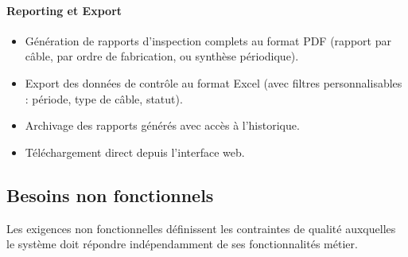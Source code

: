 \paragraph{Reporting et Export}

\begin{itemize}
    \item Génération de rapports d'inspection complets au format PDF (rapport par câble, par ordre de fabrication, ou synthèse périodique).
    \item Export des données de contrôle au format Excel (avec filtres personnalisables : période, type de câble, statut).
    \item Archivage des rapports générés avec accès à l'historique.
    \item Téléchargement direct depuis l'interface web.
\end{itemize}

\subsection{Besoins non fonctionnels}

Les exigences non fonctionnelles définissent les contraintes de qualité auxquelles le système doit répondre indépendamment de ses fonctionnalités métier.

